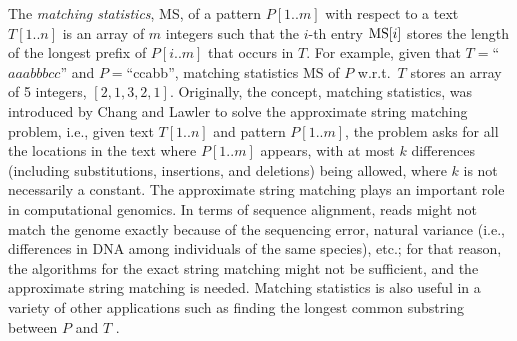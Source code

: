 \documentclass[smallabstract,smallcaptions]{dccpaper}
\begin{document}
	The {\em matching statistics}, MS, of a pattern $P[1..m]$ with respect to a text $T[1..n]$ is an array of $m$ integers such that the $i$-th entry $\textnormal{MS}[i]$ stores the length of the longest prefix of $P[i..m]$ that occurs in $T$.
	For example, given that $T=$``$aaabbbcc$'' and $P=$``ccabb'', matching statistics MS of $P$ w.r.t.\ $T$ stores an array of 5 integers, $[2, 1, 3, 2, 1]$.
	Originally, the concept, matching statistics, was introduced by Chang and Lawler \cite{chang1994sublinear} to solve the approximate string matching problem, i.e., given text $T[1..n]$ and pattern $P[1..m]$, the problem asks for all the locations in the text where $P[1..m]$ appears, with at most $k$ differences (including substitutions, insertions, and deletions) being allowed, where $k$ is not necessarily a constant. 
	The approximate string matching plays an important role in computational genomics.
	In terms of sequence alignment, reads might not match the genome exactly because of the sequencing error, natural variance (i.e., differences in DNA among individuals of the same species), etc.; for that reason, the algorithms for the exact string matching might not be sufficient, and the approximate string matching is needed.
	Matching statistics is also useful in a variety of other applications such as finding the longest common substring between $P$ and $T$ \cite{gusfield1997algorithms}.
	
\end{document}
